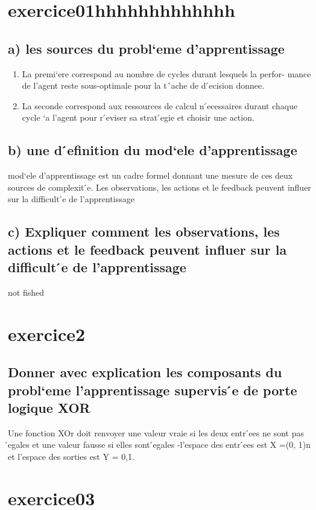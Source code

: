 \documentclass{article}
\begin{document}
\section*{exercice01hhhhhhhhhhhhh}
    \subsection*{a) les sources du probl`eme d’apprentissage}
    \begin{enumerate}
        \item La premi`ere correspond au nombre de cycles durant lesquels la perfor-
        mance de l’agent reste sous-optimale pour la tˆache de d ́ecision donnee.
        \item La seconde correspond aux ressources de calcul n ́ecessaires durant chaque
        cycle `a l’agent pour r ́eviser sa strat ́egie et choisir une action.



    \end{enumerate}
    \subsection*{b)  une d ́efinition du mod`ele d’apprentissage}
    mod`ele d’apprentissage est un cadre formel donnant une mesure de ces deux
    sources de complexit ́e. Les observations, les actions et le feedback peuvent
    influer sur la difficult ́e de l’apprentissage
    \subsection*{c) Expliquer comment les observations, les actions et le feedback peuvent influer sur la difficult ́e de l’apprentissage}
    not fished


\section*{exercice2}

    \subsection*{Donner avec explication les composants du probl`eme
    l’apprentissage supervis ́e de porte logique XOR}
    Une fonction XOr doit renvoyer une valeur vraie si les deux entr ́ees ne sont
    pas  ́egales et une valeur fausse si elles sont  ́egales -l’espace des entr ́ees est X
    =(0, 1)n et l’espace des sorties est Y = 0,1.
\section*{exercice03}
\end{document}
